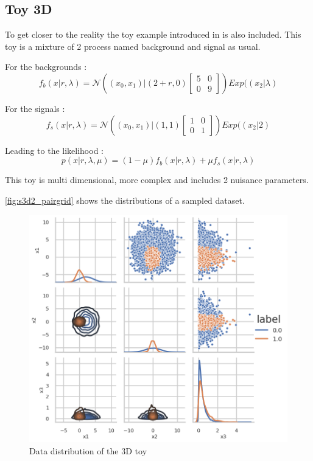 \subsection{Toy 3D} %
\label{sub:toy_3d}

To get closer to the reality the toy example introduced in \cite{DECASTRO2019170inferno} is also included.
This toy is a mixture of 2 process named background and signal as usual.


For the backgrounds :
$$
f_b (x|r, \lambda) = \mathcal N \left ( (x_0, x_1) | (2+r, 0) 
\begin{bmatrix} 5 & 0 \\ 0 & 9 \end{bmatrix} \right ) Exp((x_2| \lambda)
$$


For the signals :
$$
f_s (x|r, \lambda) = \mathcal N \left ( (x_0, x_1) | (1, 1) 
\begin{bmatrix} 1 & 0 \\ 0 & 1 \end{bmatrix} \right ) Exp((x_2| 2)
$$

Leading to the likelihood :
$$
p(x | r, \lambda, \mu ) = (1-\mu) f_b(x|r, \lambda) + \mu f_s(x|r, \lambda)
$$

This toy is multi dimensional, more complex and includes 2 nuisance parameters.

\autoref{fig:s3d2_pairgrid} shows the distributions of a sampled dataset.

\begin{figure}[htb]
    \includegraphics[width=\linewidth]{s3d2/pairgrid}
    \caption{Data distribution of the 3D toy}
    \label{fig:s3d2_pairgrid}
\end{figure}







